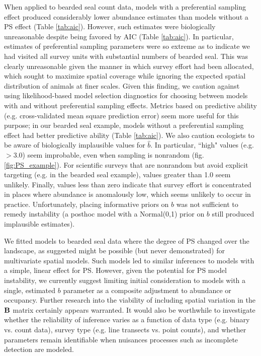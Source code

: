 \documentclass[times,mee,doublespace,]{besauth2}
\begin{document}
When applied to bearded seal count data, models with a preferential sampling effect produced considerably lower abundance estimates than models without a PS effect (Table \ref{tab:aic}).  However, such estimates were biologically unreasonable despite being favored by AIC (Table \ref{tab:aic}).  In particular, estimates of preferential sampling parameters were so extreme as to indicate we had visited all survey units with substantial numbers of bearded seal.  This was clearly unreasonable given the manner in which survey effort had been allocated, which sought to maximize spatial coverage while ignoring the expected spatial distribution of animals at finer scales.  Given this finding, we caution against using likelihood-based model selection diagnostics for choosing between models with and without preferential sampling effects.  Metrics based on predictive ability (e.g. cross-validated mean square prediction error) seem more useful for this purpose; in our bearded seal example, models without a preferential sampling effect had better predictive ability (Table \ref{tab:aic}).  We also caution ecologists to be aware of biologically implausible values for $\hat{b}$.  In particular, ``high" values (e.g. $>3.0$) seem improbable, even when sampling is nonrandom (fig. \ref{fig:PS_example}).  For scientific surveys that are nonrandom but avoid explicit targeting (e.g. in the bearded seal example), values greater than 1.0 seem unlikely.  Finally, values less than zero indicate that survey effort is concentrated in places where abundance is anomalously low, which seems unlikely to occur in practice.  Unfortunately, placing informative priors on $b$ was not sufficient to remedy instability (a posthoc model with a Normal(0,1) prior on $b$ still produced implausible estimates).

We fitted models to bearded seal data where the degree of PS changed over the landscape, as \citet{RoyleBerliner1999} suggested might be possible (but never demonstrated) for multivariate spatial models. Such models led to similar inferences to models with a simple, linear effect for PS.  However, given the potential for PS model instability, we currently suggest limiting initial consideration to models with a single, estimated $b$ parameter as a composite adjustment to abundance or occupancy.  Further research into the viability of including spatial variation in the ${\bf B}$ matrix certainly appears warranted.  It would also be worthwhile to investigate whether the reliability of inference varies as a function of data type (e.g. binary vs. count data), survey type (e.g. line transects vs. point counts), and whether parameters remain identifiable when nuisances processes such as incomplete detection are modeled.
\end{document}
